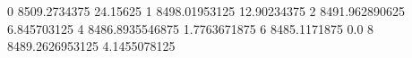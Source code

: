 0 8509.2734375 24.15625
1 8498.01953125 12.90234375
2 8491.962890625 6.845703125
4 8486.8935546875 1.7763671875
6 8485.1171875 0.0
8 8489.2626953125 4.1455078125
